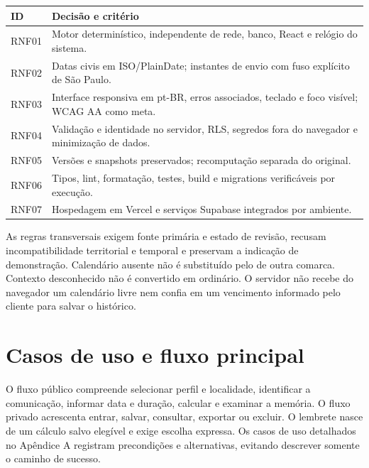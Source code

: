\begin{quadro}[H]\centering
\caption{Requisitos de qualidade e sua expressão no projeto}
\label{quadro-2}
\begin{singlespace}\fontsize{10}{12}\selectfont
\begin{tabularx}{\linewidth}{|>{\raggedright\arraybackslash}X|>{\raggedright\arraybackslash}X|}
\hline
\textbf{ID} & \textbf{Decisão e critério} \\
\hline
RNF01 & Motor determinístico, independente de rede, banco, React e relógio do sistema. \\
\hline
RNF02 & Datas civis em ISO/PlainDate; instantes de envio com fuso explícito de São Paulo. \\
\hline
RNF03 & Interface responsiva em pt-BR, erros associados, teclado e foco visível; WCAG AA como meta. \\
\hline
RNF04 & Validação e identidade no servidor, RLS, segredos fora do navegador e minimização de dados. \\
\hline
RNF05 & Versões e snapshots preservados; recomputação separada do original. \\
\hline
RNF06 & Tipos, lint, formatação, testes, build e migrations verificáveis por execução. \\
\hline
RNF07 & Hospedagem em Vercel e serviços Supabase integrados por ambiente. \\
\hline
\end{tabularx}\end{singlespace}
\par{}
\end{quadro}
As regras transversais exigem fonte primária e estado de revisão, recusam incompatibilidade territorial e temporal e preservam a indicação de demonstração. Calendário ausente não é substituído pelo de outra comarca. Contexto desconhecido não é convertido em ordinário. O servidor não recebe do navegador um calendário livre nem confia em um vencimento informado pelo cliente para salvar o histórico.

\section{Casos de uso e fluxo principal}
\label{section-4-3}
O fluxo público compreende selecionar perfil e localidade, identificar a comunicação, informar data e duração, calcular e examinar a memória. O fluxo privado acrescenta entrar, salvar, consultar, exportar ou excluir. O lembrete nasce de um cálculo salvo elegível e exige escolha expressa. Os casos de uso detalhados no Apêndice A registram precondições e alternativas, evitando descrever somente o caminho de sucesso.

